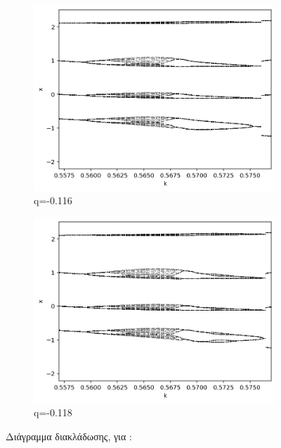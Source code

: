 \begin{figure}[h!]
\begin{subfigure}[b]{0.4\textwidth}
		\includegraphics[width=\textwidth]{LateX images/graphs/g4}
		\caption{q=-0.116}
		\label{f:g5}
	\end{subfigure}
	\hfill
	\begin{subfigure}[b]{0.4\textwidth}
		\centering
		\includegraphics[width=\textwidth]{LateX images/graphs/g5}
		\caption{q=-0.118}
		\label{f:g6}
	\end{subfigure}
\caption{Διάγραμμα διακλάδωσης, για :}
\label{f:g2}
\end{figure}


